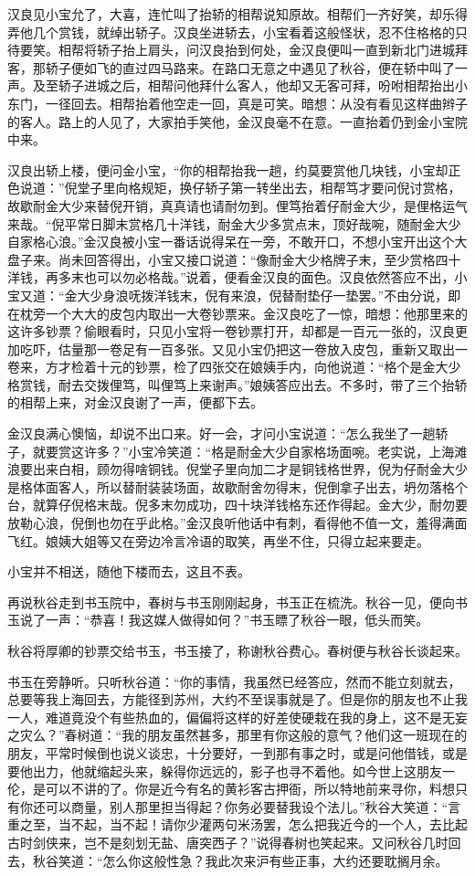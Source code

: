 \documentclass[12pt,UTF8]{ctexbook}
\begin{document}
{{{汉良见小宝允了，大喜，连忙叫了抬轿的相帮说知原故。相帮们一齐好笑，却乐得弄他几个赏钱，就绰出轿子。汉良坐进轿去，小宝看着这般怪状，忍不住格格的只待要笑。相帮将轿子抬上肩头，问汉良抬到何处，金汉良便叫一直到新北门进城拜客，那轿子便如飞的直过四马路来。在路口无意之中遇见了秋谷，便在轿中叫了一声。及至轿子进城之后，相帮问他拜什么客人，他却又无客可拜，吩咐相帮抬出小东门，一径回去。相帮抬着他空走一回，真是可笑。暗想：从没有看见这样曲辫子的客人。路上的人见了，大家拍手笑他，金汉良毫不在意。一直抬着仍到金小宝院中来。

汉良出轿上楼，便问金小宝，“你的相帮抬我一趟，约莫要赏他几块钱，小宝却正色说道：”倪堂子里向格规矩，换仔轿子第一转坐出去，相帮笃才要问倪讨赏格，故歇耐金大少来替倪开销，真真请也请耐勿到。俚笃抬着仔耐金大少，是俚格运气来哉。“倪平常日脚末赏格几十洋钱，耐金大少多赏点末，顶好哉啘，随耐金大少自家格心浪。”金汉良被小宝一番话说得呆在一旁，不敢开口，不想小宝开出这个大盘子来。尚未回答得出，小宝又接口说道：“像耐金大少格牌子末，至少赏格四十洋钱，再多末也可以勿必格哉。”说着，便看金汉良的面色。汉良依然答应不出，小宝又道：“金大少身浪呒拨洋钱末，倪有来浪，倪替耐垫仔一垫罢。”不由分说，即在枕旁一个大大的皮包内取出一大卷钞票来。金汉良吃了一惊，暗想：他那里来的这许多钞票？偷眼看时，只见小宝将一卷钞票打开，却都是一百元一张的，汉良更加吃吓，估量那一卷足有一百多张。又见小宝仍把这一卷放入皮包，重新又取出一卷来，方才检着十元的钞票，检了四张交在娘姨手内，向他说道：“格个是金大少格赏钱，耐去交拨俚笃，叫俚笃上来谢声。”娘姨答应出去。不多时，带了三个抬轿的相帮上来，对金汉良谢了一声，便都下去。

金汉良满心懊恼，却说不出口来。好一会，才问小宝说道：“怎么我坐了一趟轿子，就要赏这许多？”小宝冷笑道：“格是耐金大少自家格场面啘。老实说，上海滩浪要出来白相，顾勿得啥铜钱。倪堂子里向加二才是铜钱格世界，倪为仔耐金大少是格体面客人，所以替耐装装场面，故歇耐舍勿得末，倪倒拿子出去，坍勿落格个台，就算仔倪格末哉。倪多末勿成功，四十块洋钱格东还作得起。金大少，耐勿要放勒心浪，倪倒也勿在乎此格。”金汉良听他话中有刺，看得他不值一文，羞得满面飞红。娘姨大姐等又在旁边冷言冷语的取笑，再坐不住，只得立起来要走。

小宝并不相送，随他下楼而去，这且不表。

再说秋谷走到书玉院中，春树与书玉刚刚起身，书玉正在梳洗。秋谷一见，便向书玉说了一声：“恭喜！我这媒人做得如何？”书玉瞟了秋谷一眼，低头而笑。

秋谷将厚卿的钞票交给书玉，书玉接了，称谢秋谷费心。春树便与秋谷长谈起来。

书玉在旁静听。只听秋谷道：“你的事情，我虽然已经答应，然而不能立刻就去，总要等我上海回去，方能径到苏州，大约不至误事就是了。但是你的朋友也不止我一人，难道竟没个有些热血的，偏偏将这样的好差使硬栽在我的身上，这不是无妄之灾么？”春树道：“我的朋友虽然甚多，那里有你这般的意气？他们这一班现在的朋友，平常时候倒也说义谈忠，十分要好，一到那有事之时，或是问他借钱，或是要他出力，他就缩起头来，躲得你远远的，影子也寻不着他。如今世上这朋友一伦，是可以不讲的了。你是近今有名的黄衫客古押衙，所以特地前来寻你，料想只有你还可以商量，别人那里担当得起？你务必要替我设个法儿。”秋谷大笑道：“言重之至，当不起，当不起！请你少灌两句米汤罢，怎么把我近今的一个人，去比起古时剑侠来，岂不是刻划无盐、唐突西子？”说得春树也笑起来。又问秋谷几时回去，秋谷笑道：“怎么你这般性急？我此次来沪有些正事，大约还要耽搁月余。

}}}
\end{document}
